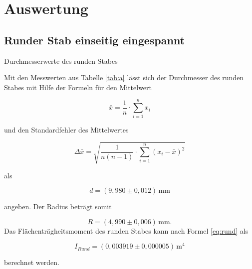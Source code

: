 \section{Auswertung}
\label{sec:Auswertung}
\subsection{Runder Stab einseitig eingespannt}
\begin{table}[H]
  \centering
  
  
  \caption{Durchmesserwerte des runden Stabes}
  \label{tab:a}
\end{table}

Mit den Messwerten aus Tabelle \ref{tab:a} lässt sich
der Durchmesser des runden Stabes mit Hilfe der Formeln
für den Mittelwert

\begin{equation}
  \bar{x}=\frac{1}{n} \cdot \sum_{i=1}^n x_i
  \label{eq:a}
\end{equation}

\noindent und den Standardfehler des Mittelwertes

\begin{equation}
  \Delta\bar{x}=\sqrt{\frac{1}{n(n-1)}\cdot \sum_{i=1}^n(x_i-\bar{x})^2}
  \label{eq:b}
\end{equation}

\noindent als 

\begin{equation*}
  d=(9,980 \pm 0,012)\,\si{\milli\meter}
\end{equation*}

\noindent angeben. Der Radius beträgt somit

\begin{equation*}
  R=(4,990 \pm 0,006)\,\si{\milli\meter}.
\end{equation*}
\noindent Das Flächenträgheitsmoment des runden Stabes kann nach Formel \ref{eq:rund}
als

\begin{equation*}
  I_{Rund}=(0,003919 \pm 0,000005)\,\si{\meter \tothe{4}}
\end{equation*}

\noindent berechnet werden. 


